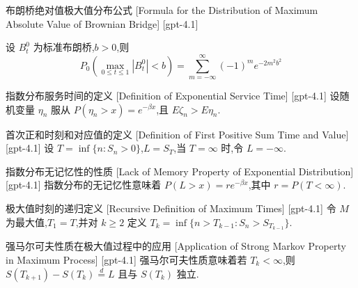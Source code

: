 \documentclass[UTF8]{ctexart}
\begin{document}
    
    
    \begin{thm}
        {布朗桥绝对值极大值分布公式}
        [Formula for the Distribution of Maximum Absolute Value of Brownian Bridge]
        [gpt-4.1]
        
设 $B_t^0$ 为标准布朗桥,$b > 0$,则
\[
P_{0}\left(\max_{0 \leq t \leq 1} |B_{t}^{0}| < b\right) = \sum_{m=-\infty}^{\infty} (-1)^{m} e^{-2m^{2} b^{2}}
\]

    \end{thm}
    
    
    
    \begin{dfn}
        {指数分布服务时间的定义}
        [Definition of Exponential Service Time]
        [gpt-4.1]
        设随机变量 $\eta_n$ 服从 $P(\eta_n > x) = e^{-\beta x}$,且 $E\zeta_n > E\eta_n$.
    \end{dfn}
    
    
    
    \begin{dfn}
        {首次正和时刻和对应值的定义}
        [Definition of First Positive Sum Time and Value]
        [gpt-4.1]
        设 $T = \inf\{ n : S_n > 0 \}$,$L = S_T$,当 $T = \infty$ 时,令 $L = -\infty$.
    \end{dfn}
    
    
    
    \begin{ppt}
        {指数分布无记忆性的性质}
        [Lack of Memory Property of Exponential Distribution]
        [gpt-4.1]
        指数分布的无记忆性意味着 $P(L > x) = r e^{-\beta x}$,其中 $r = P(T < \infty)$.
    \end{ppt}
    
    
    
    \begin{dfn}
        {极大值时刻的递归定义}
        [Recursive Definition of Maximum Times]
        [gpt-4.1]
        令 $M$ 为最大值,$T_1 = T$,并对 $k \geq 2$ 定义 $T_k = \inf\{ n > T_{k-1} : S_n > S_{T_{k-1}} \}$.
    \end{dfn}
    
    
    
    \begin{ppt}
        {强马尔可夫性质在极大值过程中的应用}
        [Application of Strong Markov Property in Maximum Process]
        [gpt-4.1]
        强马尔可夫性质意味着若 $T_k < \infty$,则 $S(T_{k+1}) - S(T_k) \overset{d}{=} L$ 且与 $S(T_k)$ 独立.
    \end{ppt}
    
\end{document}
